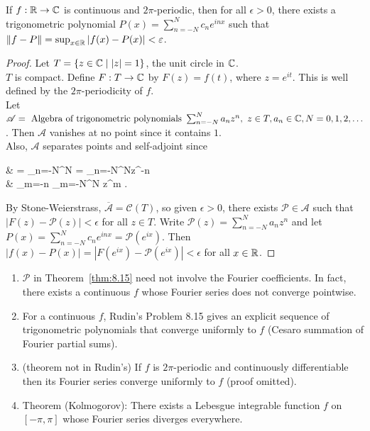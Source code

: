 \begin{thm}[15]
	If $f: \mathbb{R}\to \mathbb{C}$ is continuous and $2\pi$-periodic, then for all $\epsilon>0$, there exists a trigonometric polynomial $P(x)=\sum_{n=-N}^{N}{c_n e^{inx}}$ such that $\|f-P\|= \sup_{x \in \mathbb{R}} \left|f(x)-P(x)\right|<\varepsilon$.
	\begin{proof}
		Let $T=\{ z \in \mathbb{C} \mid \left|z\right|=1\}$, the unit circle in $\mathbb{C}$.\\
		$T$ is compact. Define $F: T\to \mathbb{C}$ by $F(z)=f(t)$, where $z=e^{it}$. This is well defined by the $2\pi$-periodicity of $f$.\\
		Let $\mathscr{A}=\text{ Algebra of trigonometric polynomials } \sum_{n=-N}^{N}{a_{n}z^{n}}, \,\, z \in T, a_{n} \in \mathbb{C}, N=0,1,2, \ldots $. Then $\mathscr{A}$ vanishes at no point since it contains $1$.\\
		Also, $\mathscr{A}$ separates points and self-adjoint since
		\begin{flalign*}
			 & = \sum_{n=-N}^{N}{}      = \sum_{n=-N}^{N}{z^{-n}} \\
			                                                    & \underbrace{=}_{m=-n} \sum_{m=-N}^{N}{ z^{m}} \in {}
			.\end{flalign*}
		By Stone-Weierstrass, $\overline{\mathscr{A}}= \mathscr{C}(T)$, so given $\epsilon>0$, there exists $\mathscr{P} \in \mathscr{A}$ such that $\left|F(z)-\mathscr{P}(z)\right|<\epsilon$ for all $z \in T$.
		Write $\mathscr{P}(z)=\sum_{n=-N}^{N}{a_n z^{n}}$ and let $P(x)=\sum_{n=-N}^{N}{c_n e^{inx}}= \mathscr{P}(e^{ix})$.
		Then $\left|f(x)-P(x)\right|=\left|F(e^{ix})-\mathscr{P}(e^{ix})\right|<\epsilon$ for all $x \in \mathbb{R}$.
	\end{proof}
	\begin{remark}
		\begin{enumerate}
			\item $\mathscr{P}$ in Theorem~\ref{thm:8.15} need not involve the Fourier coefficients. In fact, there exists a continuous $f$ whose Fourier series does not converge pointwise.
			\item For a continuous $f$, Rudin's Problem 8.15 gives an explicit sequence of trigonometric polynomials that converge uniformly to $f$ (Cesaro summation of Fourier partial sums).
			\item (theorem not in Rudin's) If $f$ is $2\pi$-periodic and continuously differentiable then its Fourier series converge uniformly to $f$ (proof omitted).
			\item Theorem (Kolmogorov): There exists a Lebesgue integrable function $f$ on $[-\pi,\pi]$ whose Fourier series diverges everywhere.
		\end{enumerate}
	\end{remark}
\end{thm}

